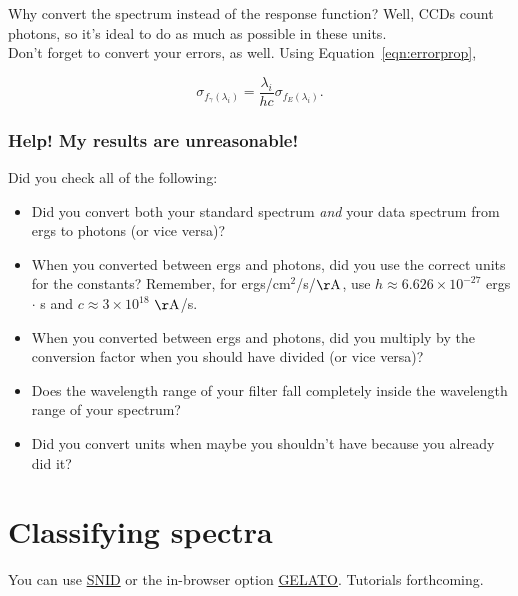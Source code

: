 Why convert the spectrum instead of the response function? Well, CCDs count photons, so it's ideal to do as much as possible in these units. \\

Don't forget to convert your errors, as well. Using Equation~\ref{eqn:errorprop},

\begin{equation}
    \sigma_{f_{\gamma}(\lambda_{i})} = \frac{\lambda_{i}}{hc}\sigma_{f_{E}(\lambda_{i})}.
\end{equation}

\subsubsection{Help! My results are unreasonable!}

Did you check all of the following:
\begin{itemize}
    \item Did you convert both your standard spectrum \textit{and} your data spectrum from ergs to photons (or vice versa)?
    \item When you converted between ergs and photons, did you use the correct units for the constants? Remember, for ergs/cm$^{2}$/s/$\mathrm{\AA}$, use $h \approx 6.626 \times 10^{-27}$ ergs $\cdot$ s and $c \approx 3\times 10^{18}$ $\mathrm{\AA}$/s. 
    \item When you converted between ergs and photons, did you multiply by the conversion factor when you should have divided (or vice versa)? 
    \item Does the wavelength range of your filter fall completely inside the wavelength range of your spectrum? 
    \item Did you convert units when maybe you shouldn't have because you already did it? 
\end{itemize}

\section{Classifying spectra}
You can use \href{https://people.lam.fr/blondin.stephane/software/snid/}{SNID} or the in-browser option \href{https://gelato.tng.iac.es/gelato/}{GELATO}. Tutorials forthcoming. 